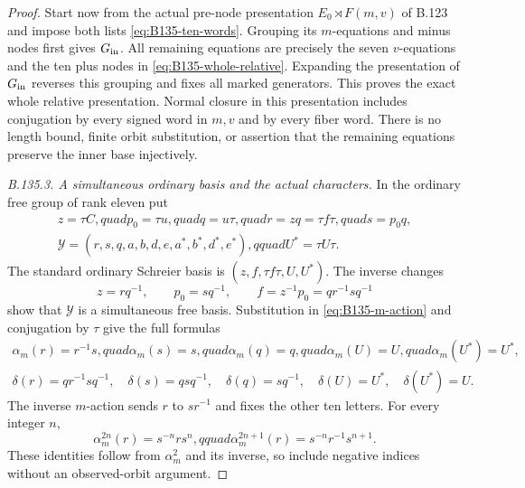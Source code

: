 \begin{proof}
Start now from the actual pre-node presentation
$E_0\rtimes F(m,v)$ of B.123 and impose both lists
\eqref{eq:B135-ten-words}. Grouping its $m$-equations and
minus nodes first gives $G_{\rm in}$. All remaining equations
are precisely the seven $v$-equations and the ten plus nodes
in \eqref{eq:B135-whole-relative}. Expanding the presentation
of $G_{\rm in}$ reverses this grouping and fixes all marked
generators. This proves the exact whole relative presentation.
Normal closure in this presentation includes conjugation by
every signed word in $m,v$ and by every fiber word. There is
no length bound, finite orbit substitution, or assertion that
the remaining equations preserve the inner base injectively.

\emph{B.135.3. A simultaneous ordinary basis and the actual characters.}
In the ordinary free group of rank eleven put
\begin{equation}\label{eq:B135-new-basis}
 \begin{gathered}
 z=\tau C,quad p_0=\tau u,quad q=u\tau,quad
 r=zq=\tau f\tau,quad s=p_0q,\\
 \mathcal Y=(r,s,q,a,b,d,e,a^*,b^*,d^*,e^*),qquad U^*=\tau U\tau.
 \end{gathered}
\end{equation}
The standard ordinary Schreier basis is
$(z,f,\tau f\tau,U,U^*)$. The inverse changes
\[
 z=rq^{-1},\qquad p_0=sq^{-1},\qquad
 f=z^{-1}p_0=q r^{-1}s q^{-1}
\]
show that \(\mathcal Y\) is a simultaneous free basis.
Substitution in \eqref{eq:B135-m-action} and conjugation by
$\tau$ give the full formulas
\begin{equation}\label{eq:B135-basis-actions}
 \begin{gathered}
 \alpha_m(r)=r^{-1}s,quad
 \alpha_m(s)=s,quad\alpha_m(q)=q,quad
 \alpha_m(U)=U,quad\alpha_m(U^*)=U^*,\\
 \delta(r)=q r^{-1}s q^{-1},\quad
 \delta(s)=q s q^{-1},\quad\delta(q)=s q^{-1},\quad
 \delta(U)=U^*,\quad\delta(U^*)=U.
 \end{gathered}
\end{equation}
The inverse $m$-action sends $r$ to $sr^{-1}$ and fixes
the other ten letters. For every integer $n$,
\[
 \alpha_m^{2n}(r)=s^{-n}rs^n,qquad
 \alpha_m^{2n+1}(r)=s^{-n}r^{-1}s^{n+1}.
\]
These identities follow from $\alpha_m^2$ and its inverse,
so include negative indices without an observed-orbit argument.


\end{proof}
